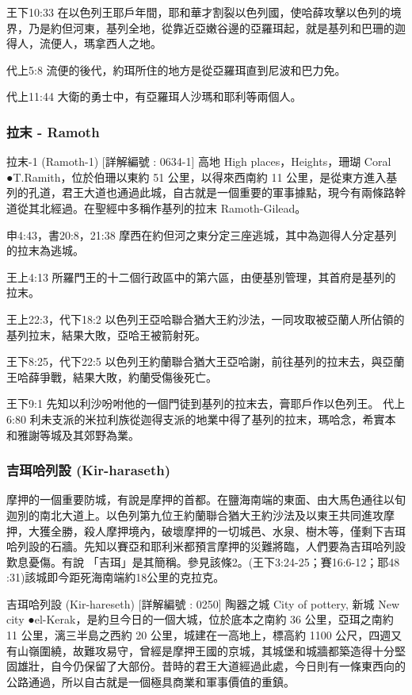 王下10:33 在以色列王耶戶年間，耶和華才割裂以色列國，使哈薛攻擊以色列的境界，乃是約但河東，基列全地，從靠近亞嫩谷邊的亞羅珥起，就是基列和巴珊的迦得人，流便人，瑪拿西人之地。

代上5:8 流便的後代，約珥所住的地方是從亞羅珥直到尼波和巴力免。

代上11:44 大衛的勇士中，有亞羅珥人沙瑪和耶利等兩個人。

\subsubsection{拉末 - Ramoth}
拉末-1   (Ramoth-1) [詳解編號 : 0634-1]
高地 High places，Heights，珊瑚 Coral
●T.Ramith，位於伯珊以東約 51 公里，以得來西南約 11 公里，是從東方進入基列的孔道，君王大道也通過此城，自古就是一個重要的軍事據點，現今有兩條路幹道從其北經過。在聖經中多稱作基列的拉末 Ramoth-Gilead。

申4:43，書20:8，21:38 摩西在約但河之東分定三座逃城，其中為迦得人分定基列的拉末為逃城。

王上4:13 所羅門王的十二個行政區中的第六區，由便基別管理，其首府是基列的拉末。

王上22:3，代下18:2 以色列王亞哈聯合猶大王約沙法，一同攻取被亞蘭人所佔領的基列拉末，結果大敗，亞哈王被箭射死。

王下8:25，代下22:5 以色列王約蘭聯合猶大王亞哈謝，前往基列的拉末去，與亞蘭王哈薛爭戰，結果大敗，約蘭受傷後死亡。

王下9:1 先知以利沙吩咐他的一個門徒到基列的拉末去，膏耶戶作以色列王。
代上6:80 利未支派的米拉利族從迦得支派的地業中得了基列的拉末，瑪哈念，希實本和雅謝等城及其郊野為業。



\subsubsection{吉珥哈列設 (Kir-haraseth)}
摩押的一個重要防城，有說是摩押的首都。在鹽海南端的東面、由大馬色通往以旬迦別的南北大道上。以色列第九位王約蘭聯合猶大王約沙法及以東王共同進攻摩押，大獲全勝，殺人摩押境內，破壞摩押的一切城邑、水泉、樹木等，僅剩下吉珥哈列設的石牆。先知以賽亞和耶利米都預言摩押的災難將臨，人們要為吉珥哈列設歎息憂傷。有說 「吉珥」是其簡稱。參見該條2。(王下3:24-25；賽16:6-12；耶48 :31)該城即今距死海南端約18公里的克拉克。


吉珥哈列設   (Kir-hareseth) [詳解編號 : 0250]
陶器之城 City of pottery, 新城 New city
●el-Kerak，是約旦今日的一個大城，位於底本之南約 36 公里，亞珥之南約 11 公里，漓三半島之西約 20 公里，城建在一高地上，標高約 1100 公尺，四週又有山嶺圍繞，故難攻易守，曾經是摩押王國的京城，其城堡和城牆都築造得十分堅固雄壯，自今仍保留了大部份。昔時的君王大道經過此處，今日則有一條東西向的公路通過，所以自古就是一個極具商業和軍事價值的重鎮。

